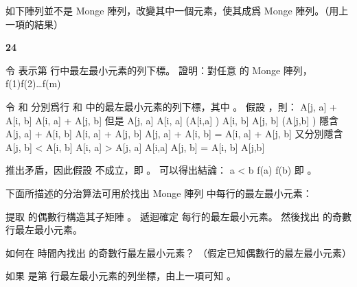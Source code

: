 \startitem
如下陣列並不是 Monge 陣列，改變其中一個元素，使其成爲 Monge 陣列。（\hint 用上一項的結果）
\startformula\startmatrix
{}    \NR
{}    \NR
{}    \NR
{}    \NR
{}    \NR
\stopmatrix\stopformula
\stopitem

\startANSWER

\startformula\startmatrix
{}  \NC \bf 24  \NR
{}    \NR
{}    \NR
{}    \NR
{}    \NR
\stopmatrix\stopformula
\stopANSWER

\item 令  表示第  行中最左最小元素的列下標。
證明：對任意  的 Monge 陣列，
\startformula
f(1)\le f(2)\le\ldots\le f(m)
\stopformula

\startANSWER
令  和  分別爲行  和  中的最左最小元素的列下標，其中 。
假設 ，則：
\startformula
A[j, a] + A[i, b] \le A[i, a] + A[j, b]
\stopformula
但是\startformula\startmathalignment
\NC A[j, a] \ge A[i, a] \NC \quad (A[i,a] ) \NR
\NC A[i, b] \ge A[j, b] \NC \quad (A[j,b] ) \NR
\stopmathalignment\stopformula
隱含\startformula\startmathalignment
\NC A[j, a] + A[i, b] \ge A[i, a] + A[j, b] \NR
\NC \Downarrow \NR
\NC A[j, a] + A[i, b] = A[i, a] + A[j, b] \NR
\stopmathalignment\stopformula
又分別隱含\startformula\startmathalignment
\NC A[j, b] < A[i, b] \Rightarrow A[i, a] > A[j, a] \NC \Rightarrow A[i,a]  \NR
\NC A[j, b] = A[i, b] \NC \Rightarrow A[j,b]  \NR
\stopmathalignment\stopformula

推出矛盾，因此假設  不成立，即 。
可以得出結論：
\startformula
a < b \Rightarrow f(a) \le f(b)
\stopformula
即 。

\stopANSWER

\startitem
下面所描述的分治算法可用於找出  Monge 陣列  中每行的最左最小元素：

提取  的偶數行構造其子矩陣 。
遞迴確定  每行的最左最小元素。
然後找出  的奇數行最左最小元素。

如何在  時間內找出  的奇數行最左最小元素？
（假定已知偶數行的最左最小元素）
\stopitem

\startANSWER
如果  是第  行最左最小元素的列坐標，由上一項可知 。

